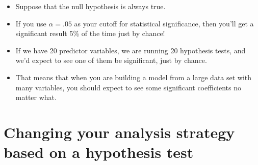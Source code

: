 \documentclass{beamer}\usepackage[]{graphicx}\usepackage[]{color}
\makeatletter
\newenvironment{kframe}{%
 \def\at@end@of@kframe{}%
 \ifinner\ifhmode%
  \def\at@end@of@kframe{\end{minipage}}%
  \begin{minipage}{\columnwidth}%
 \fi\fi%
 \def\FrameCommand##1{\hskip\@totalleftmargin \hskip-\fboxsep
 \colorbox{shadecolor}{##1}\hskip-\fboxsep
     \hskip-\linewidth \hskip-\@totalleftmargin \hskip\columnwidth}%
 \MakeFramed {\advance\hsize-\width
   \@totalleftmargin\z@ \linewidth\hsize
   \@setminipage}}%
 {\par\unskip\endMakeFramed%
 \at@end@of@kframe}
\newenvironment{knitrout}{}{} %
\makeatother
\begin{document}
\begin{darkframes}
\begin{frame}[fragile]
\begin{knitrout}
\begin{kframe}
\begin{verbatim}
\end{verbatim}
\end{kframe}
\end{knitrout}
    \end{frame}

    \begin{frame}
      \begin{itemize}[<+->]
        \item Suppose that the null hypothesis is always true.
        \item If you use $\alpha=.05$ as your cutoff for statistical significance, then you'll get a significant result 5\% of the time just by chance!
        \item If we have 20 predictor variables, we are running 20 hypothesis tests, and we'd \alert{expect} to see one of them be significant, just by chance.
        \item That means that when you are building a model from a large data set with many variables, you should expect to see some significant coefficients no matter what.
      \end{itemize}
    \end{frame}

    \section{Changing your analysis strategy based on a hypothesis test}


\end{darkframes}
\end{document}
